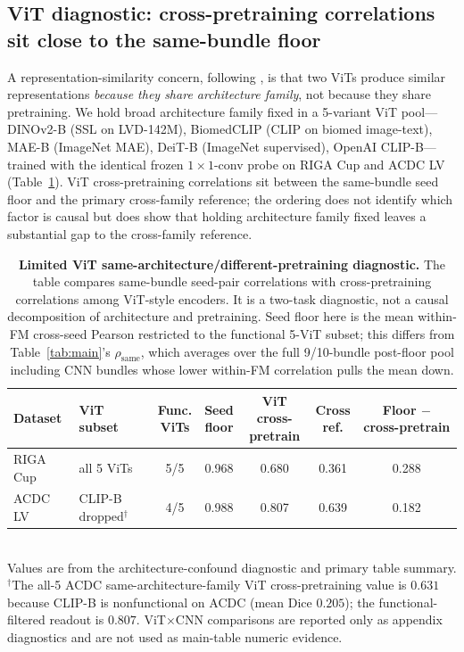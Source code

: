 \documentclass{article}
\begin{document}
\subsection{ViT diagnostic: cross-pretraining correlations sit close to the same-bundle floor}
\label{sec:arch-vs-pretrain}
A representation-similarity concern, following \citet{kornblith2019similarity}, is that two ViTs produce similar representations \emph{because they share architecture family}, not because they share pretraining. We hold broad architecture family fixed in a 5-variant ViT pool---DINOv2-B (SSL on LVD-142M), BiomedCLIP (CLIP on biomed image-text), MAE-B (ImageNet MAE), DeiT-B (ImageNet supervised), OpenAI CLIP-B---trained with the identical frozen $1{\times}1$-conv probe on RIGA Cup and ACDC LV (Table~\ref{tab:arch-confound}). ViT cross-pretraining correlations sit between the same-bundle seed floor and the primary cross-family reference; the ordering does not identify which factor is causal but does show that holding architecture family fixed leaves a substantial gap to the cross-family reference.

\begin{table}[h]
  \caption{\textbf{Limited ViT same-architecture/different-pretraining diagnostic.}
  The table compares same-bundle seed-pair correlations with cross-pretraining correlations among ViT-style encoders. It is a two-task diagnostic, not a causal decomposition of architecture and pretraining. Seed floor here is the mean within-FM cross-seed Pearson restricted to the functional 5-ViT subset; this differs from Table~\ref{tab:main}'s $\rho_{\mathrm{same}}$, which averages over the full 9/10-bundle post-floor pool including CNN bundles whose lower within-FM correlation pulls the mean down.}
  \label{tab:arch-confound}
  \centering\footnotesize
  \setlength{\tabcolsep}{4pt}
  \begin{tabular*}{\linewidth}{@{\extracolsep{\fill}}llccccc}
    \toprule
    Dataset & ViT subset & \makecell[c]{Func.\\ViTs} & \makecell[c]{Seed\\floor} & \makecell[c]{ViT cross-\\pretrain} & \makecell[c]{Cross\\ref.} & \makecell[c]{Floor $-$\\cross-pretrain} \\
    \midrule
    RIGA Cup & all 5 ViTs & 5/5 & 0.968 & 0.680 & 0.361 & 0.288 \\
    ACDC LV & CLIP-B dropped$^{\dag}$ & 4/5 & 0.988 & 0.807 & 0.639 & 0.182 \\
    \bottomrule
  \end{tabular*}
  \\[2pt]
  {\footnotesize Values are from the architecture-confound diagnostic and primary table summary. $^{\dag}$The all-5 ACDC same-architecture-family ViT cross-pretraining value is $0.631$ because CLIP-B is nonfunctional on ACDC (mean Dice $0.205$); the functional-filtered readout is $0.807$. ViT$\times$CNN comparisons are reported only as appendix diagnostics and are not used as main-table numeric evidence.}
\end{table}
\end{document}
